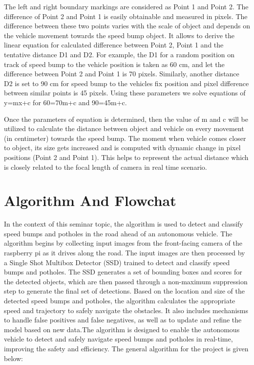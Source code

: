 \noindent
The left and right boundary markings are considered as Point 1 and Point 2. The difference of Point 2 and Point 1 is easily obtainable and measured in pixels. The difference between these two points varies with the scale of object and depends on the vehicle movement towards the speed bump object. It allows to derive the linear equation for calculated difference between Point 2, Point 1 and the tentative distance D1 and D2. For example, the D1 for a random position on track of speed bump to the vehicle position is taken as 60 cm, and let the difference between Point 2 and Point 1 is 70 pixels. Similarly, another distance D2 is set to 90 cm for speed bump to the vehicles fix position and pixel difference between similar points is 45 pixels. Using these parameters we solve equations of y=mx+c for 60=70m+c and 90=45m+c. 

\noindent
Once the parameters of equation is determined, then the
value of m and c will be utilized to calculate the distance
between object and vehicle on every movement (in centimeter)
towards the speed bump. The moment when vehicle comes
closer to object, its size gets increased and is computed with
dynamic change in pixel positions (Point 2 and Point 1). This
helps to represent the actual distance which is closely related to the focal length of camera in real time scenario.

\section{Algorithm And Flowchat}
In the context of this seminar topic, the algorithm is used to detect and classify speed bumps and potholes in the road ahead of an autonomous vehicle. The algorithm begins by collecting input images from the front-facing camera of the raspberry pi as it drives along the road. The input images are then processed by a Single Shot Multibox Detector (SSD) trained to detect and classify speed bumps and potholes. The SSD generates a set of bounding boxes and scores for the detected objects, which are then passed through a non-maximum suppression step to generate the final set of detections. Based on the location and size of the detected speed bumps and potholes, the algorithm calculates the appropriate speed and trajectory to safely navigate the obstacles. It also includes mechanisms to handle false positives and false negatives, as well as to update and refine the model based on new data.The algorithm is designed to enable the autonomous vehicle to detect and safely navigate speed bumps and potholes in real-time, improving the safety and efficiency. The general algorithm for the project is given below: 

